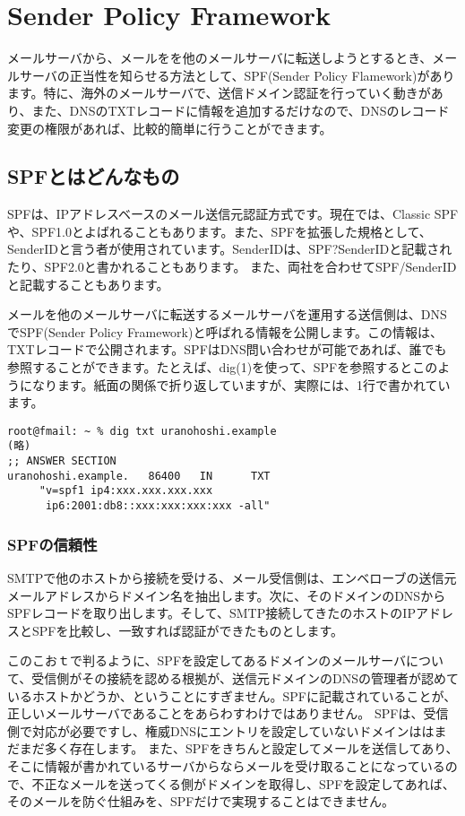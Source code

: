 \chapter{Sender Policy Framework}

メールサーバから、メールをを他のメールサーバに転送しようとするとき、メールサーバの正当性を知らせる方法として、SPF(Sender Policy Flamework)があります。特に、海外のメールサーバで、送信ドメイン認証を行っていく動きがあり、また、DNSのTXTレコードに情報を追加するだけなので、DNSのレコード変更の権限があれば、比較的簡単に行うことができます。

\section{SPFとはどんなもの}

SPFは、IPアドレスベースのメール送信元認証方式です。現在では、Classic SPFや、SPF1.0とよばれることもあります。また、SPFを拡張した規格として、SenderIDと言う者が使用されています。SenderIDは、SPF?SenderIDと記載されたり、SPF2.0と書かれることもあります。
また、両社を合わせてSPF/SenderIDと記載することもあります。

メールを他のメールサーバに転送するメールサーバを運用する送信側は、DNSでSPF(Sender Policy Framework)と呼ばれる情報を公開します。この情報は、TXTレコードで公開されます。SPFはDNS問い合わせが可能であれば、誰でも参照することができます。たとえば、dig(1)を使って、SPFを参照するとこのようになります。紙面の関係で折り返していますが、実際には、1行で書かれています。

\begin{verbatim}
root@fmail: ~ % dig txt uranohoshi.example
(略)
;; ANSWER SECTION
uranohoshi.example.   86400   IN      TXT
     "v=spf1 ip4:xxx.xxx.xxx.xxx 
      ip6:2001:db8::xxx:xxx:xxx:xxx -all"
\end{verbatim}

\subsection{SPFの信頼性}
SMTPで他のホストから接続を受ける、メール受信側は、エンベローブの送信元メールアドレスからドメイン名を抽出します。次に、そのドメインのDNSからSPFレコードを取り出します。そして、SMTP接続してきたのホストのIPアドレスとSPFを比較し、一致すれば認証ができたものとします。

このこおｔで判るように、SPFを設定してあるドメインのメールサーバについて、受信側がその接続を認める根拠が、送信元ドメインのDNSの管理者が認めているホストかどうか、ということにすぎません。SPFに記載されていることが、正しいメールサーバであることをあらわすわけではありません。
SPFは、受信側で対応が必要ですし、権威DNSにエントリを設定していないドメインははまだまだ多く存在します。
また、SPFをきちんと設定してメールを送信してあり、そこに情報が書かれているサーバからならメールを受け取ることになっているので、不正なメールを送ってくる側がドメインを取得し、SPFを設定してあれば、そのメールを防ぐ仕組みを、SPFだけで実現することはできません。

